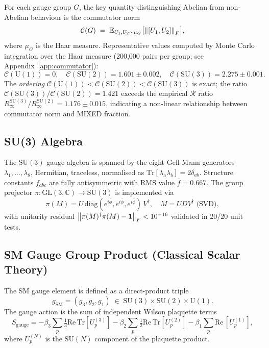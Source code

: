 \documentclass[12pt,a4paper]{article}
\newcommand{\R}{\mathcal{R}}           %
\newcommand{\SU}[1]{\mathrm{SU}(#1)}
\newcommand{\UN}[1]{\mathrm{U}(#1)}
\theoremstyle{plain}
\theoremstyle{definition}
\theoremstyle{remark}
\begin{document}
For each gauge group $G$, the key quantity distinguishing Abelian from non-Abelian
behaviour is the commutator norm
\begin{equation}
  \mathcal{C}(G) \;=\; \mathbb{E}_{U_1,U_2\sim\mu_G}\bigl[\norm{\comm{U_1}{U_2}}_F\bigr],
\end{equation}
where $\mu_G$ is the Haar measure.
Representative values computed by Monte Carlo integration over the Haar measure
(200{,}000 pairs per group; see Appendix~\ref{app:commutator}):
\begin{equation}
  \mathcal{C}(\UN{1})=0, \quad \mathcal{C}(\SU{2})=1.601\pm0.002, \quad
  \mathcal{C}(\SU{3})=2.275\pm0.001.
\end{equation}
The \emph{ordering} $\mathcal{C}(\UN{1})<\mathcal{C}(\SU{2})<\mathcal{C}(\SU{3})$ is
exact; the ratio $\mathcal{C}(\SU{3})/\mathcal{C}(\SU{2})=1.421$ exceeds the
empirical $\R$ ratio $R_\infty^{\SU{3}}/R_\infty^{\SU{2}}=1.176\pm0.015$,
indicating a non-linear relationship between commutator norm and MIXED fraction.

\subsection{SU(3) Algebra}

The $\SU{3}$ gauge algebra is spanned by the eight Gell-Mann generators
$\lambda_1,\ldots,\lambda_8$, Hermitian, traceless, normalised as
$\mathrm{Tr}[\lambda_a\lambda_b]=2\delta_{ab}$.
Structure constants $f_{abc}$ are fully antisymmetric with RMS value
$\bar{f}=0.667$.
The group projector $\pi:\mathrm{GL}(3,\mathbb{C})\to\SU{3}$ is implemented via
\begin{equation}
  \pi(M) = U\,\mathrm{diag}(e^{i\bar{\phi}},e^{i\bar{\phi}},e^{i\bar{\phi}})\,V^\dagger,
  \quad M=UDV^\dagger \;\text{(SVD)},
\end{equation}
with unitarity residual $\norm{\pi(M)^\dagger\pi(M)-\mathbf{1}}_F < 10^{-16}$
validated in 20/20 unit tests.

\subsection{SM Gauge Group Product (Classical Scalar Theory)}

The SM gauge element is defined as a direct-product triple
\begin{equation}
  g_\text{SM} = (g_3, g_2, g_1) \;\in\; \SU{3}\times\SU{2}\times\UN{1}.
\end{equation}
The gauge action is the sum of independent Wilson plaquette terms
\begin{equation}
  S_\text{gauge} = -\beta_3 \sum_p \tfrac{1}{3}\mathrm{Re}\,\mathrm{Tr}[U_p^{(3)}]
                   -\beta_2 \sum_p \tfrac{1}{2}\mathrm{Re}\,\mathrm{Tr}[U_p^{(2)}]
                   -\beta_1 \sum_p \mathrm{Re}\,[U_p^{(1)}],
\end{equation}
where $U_p^{(N)}$ is the $\SU{N}$ component of the plaquette product.
\end{document}
